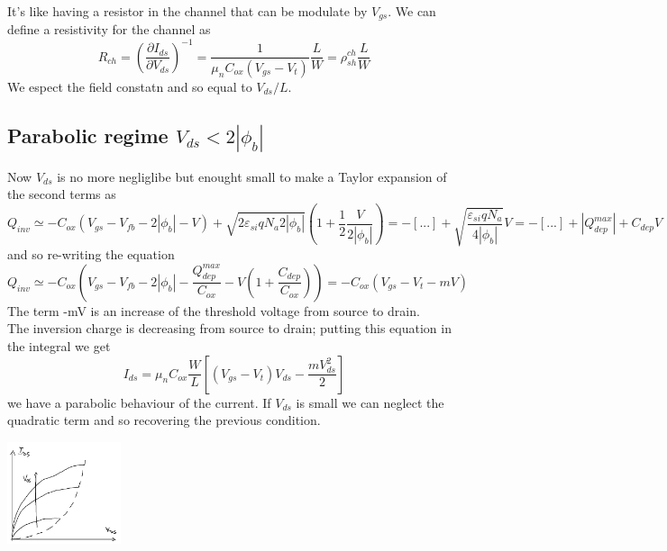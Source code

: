 It's like having a resistor in the channel that can be modulate by $V_{gs}$. We can define a resistivity for the channel as 
\begin{equation}
R_{ch}=(\frac{\partial I_{ds}}{\partial V_{ds}})^{-1}=\frac{1}{\mu_nC_{ox}(V_{gs}-V_{t})}\frac{L}{W}=\rho_{sh}^{ch}\frac{L}{W}
\end{equation}
We espect the field constatn and so equal to $V_{ds}/L$.\\

\subsection{Parabolic regime $V_{ds}<2|\phi_b|$}
Now $V_{ds}$ is no more negliglibe but enought small to make a Taylor expansion of the second terms as
\begin{equation}
Q_{inv}\simeq -C_{ox}(V_{gs}-V_{fb}-2|\phi_b|-V)+\sqrt{2\varepsilon_{si}qN_a2|\phi_b|}(1+\frac{1}{2}\frac{V}{2|\phi_b|})=-[...]+\sqrt{\frac{\varepsilon_{si}qN_a}{4|\phi_b|}}V=-[...]+|Q_{dep}^{max}|+C_{dep}V
\end{equation}
and so re-writing the equation
\begin{equation}
Q_{inv}\simeq-C_{ox}(V_{gs}-V_{fb}-2|\phi_b|-\frac{Q_{dep}^{max}}{C_{ox}}-V(1+\frac{C_{dep}}{C_{ox}}))=-C_{ox}(V_{gs}-V_t-mV)
\end{equation}
The term -mV is an increase of the threshold voltage from source to drain.\\
The inversion charge is decreasing from source to drain; putting this equation in the integral we get 
\begin{equation}
I_{ds}=\mu_nC_{ox}\frac{W}{L}[(V_{gs}-V_t)V_{ds}-\frac{mV_{ds}^2}{2}]
\end{equation}
we have a parabolic behaviour of the current. If $V_{ds}$ is small we can neglect the quadratic term and so recovering the previous condition.


\centering
\includegraphics[width=0.25\textwidth]{parabreg.png}\\
\raggedright



